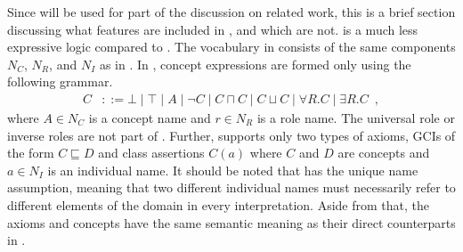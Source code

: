 Since \ALC will be used for part of the discussion on related work, this is a brief section discussing what features are included in \ALC, and which are not. \ALC is a much less expressive logic compared to \SROIQ. The vocabulary in \ALC consists of the same components $N_C$, $N_R$, and $N_I$ as in \SROIQ. In \ALC, concept expressions are formed only using the following grammar.
\begin{align*}
  C &::= \bot \mid \top \mid A \mid \neg C \mid C \sqcap C \mid C \sqcup C \mid \forall R.C \mid \exists R.C \enspace,
\end{align*}
where $A \in N_C$ is a concept name and $r \in N_R$ is a role name. The universal role or inverse roles are not part of \ALC. Further, \ALC supports only two types of axioms, GCIs of the form $C \sqsubseteq D$ and class assertions $C(a)$ where $C$ and $D$ are concepts and $a \in N_I$ is an individual name. It should be noted that \ALC has the unique name assumption, meaning that two different individual names must necessarily refer to different elements of the domain in every interpretation. Aside from that, the axioms and concepts have the same semantic meaning as their direct counterparts in \SROIQ.

